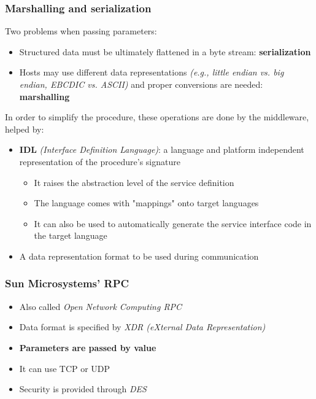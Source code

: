 \subsubsection{Marshalling and serialization}

Two problems when passing parameters:
\begin{itemize}
    \item Structured data must be ultimately flattened in a byte stream: \textbf{serialization}
    \item Hosts may use different data representations \textit{(e.g., little endian vs. big endian, EBCDIC vs. ASCII)} and proper conversions are needed: \textbf{marshalling}
\end{itemize}
In order to simplify the procedure, these operations are done by the middleware, helped by:

\begin{itemize}
    \item \textbf{IDL} \textit{(Interface Definition Language)}: a language and platform independent representation of the procedure's signature
    \begin{itemize}
        \item It raises the abstraction level of the service definition
        \item The language comes with "mappings" onto target languages
        \item It can also be used to automatically generate the service interface code in the target language 
    \end{itemize}
    \item A data representation format to be used during communication
\end{itemize}

\subsubsection{Sun Microsystems' RPC}
\begin{itemize}
    \item Also called \textit{Open Network Computing RPC}
    \item Data format is specified by \textit{XDR (eXternal Data Representation)}
    \item \textbf{Parameters are passed by value}
    \item It can use TCP or UDP
    \item Security is provided through \textit{DES}
\end{itemize}

